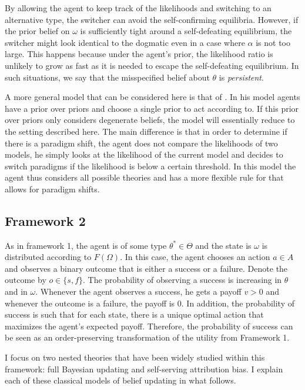 \documentclass[
  12pt,
]{article}
\begin{document}
By allowing the agent to keep track of the likelihoods and switching to
an alternative type, the switcher can avoid the self-confirming
equilibria. However, if the prior belief on \(\omega\) is sufficiently
tight around a self-defeating equilibrium, the switcher might look
identical to the dogmatic even in a case where \(\alpha\) is not too
large. This happens because under the agent's prior, the likelihood
ratio is unlikely to grow as fast as it is needed to escape the
self-defeating equilibrium. In such situations, we say that the
misspecified belief about \(\theta\) is \emph{persistent}.

A more general model that can be considered here is that of
\citet{Ortoleva2012}. In his model agents have a prior over priors and
choose a single prior to act according to. If this prior over priors
only considers degenerate beliefs, the model will essentially reduce to
the setting described here. The main difference is that in order to
determine if there is a paradigm shift, the agent does not compare the
likelihoods of two models, he simply looks at the likelihood of the
current model and decides to switch paradigms if the likelihood is below
a certain threshold. In this model the agent thus considers all possible
theories and has a more flexible rule for that allows for paradigm
shifts.

\hypertarget{framework-2}{%
\subsection{Framework 2}\label{framework-2}}

As in framework 1, the agent is of some type \(\theta^* \in \Theta\) and
the state is \(\omega\) is distributed according to \(F(\Omega)\). In
this case, the agent chooses an action \(a\in A\) and observes a binary
outcome that is either a success or a failure. Denote the outcome by
\(o \in \{s,f\}\). The probability of observing a success is increasing
in \(\theta\) and in \(\omega\). Whenever the agent observes a success,
he gets a payoff \(v>0\) and whenever the outcome is a failure, the
payoff is 0. In addition, the probability of success is such that for
each state, there is a unique optimal action that maximizes the agent's
expected payoff. Therefore, the probability of success can be seen as an
order-preserving transformation of the utility from Framework 1.

I focus on two nested theories that have been widely studied within this
framework: full Bayesian updating and self-serving attribution bias. I
explain each of these classical models of belief updating in what
follows.
\end{document}
